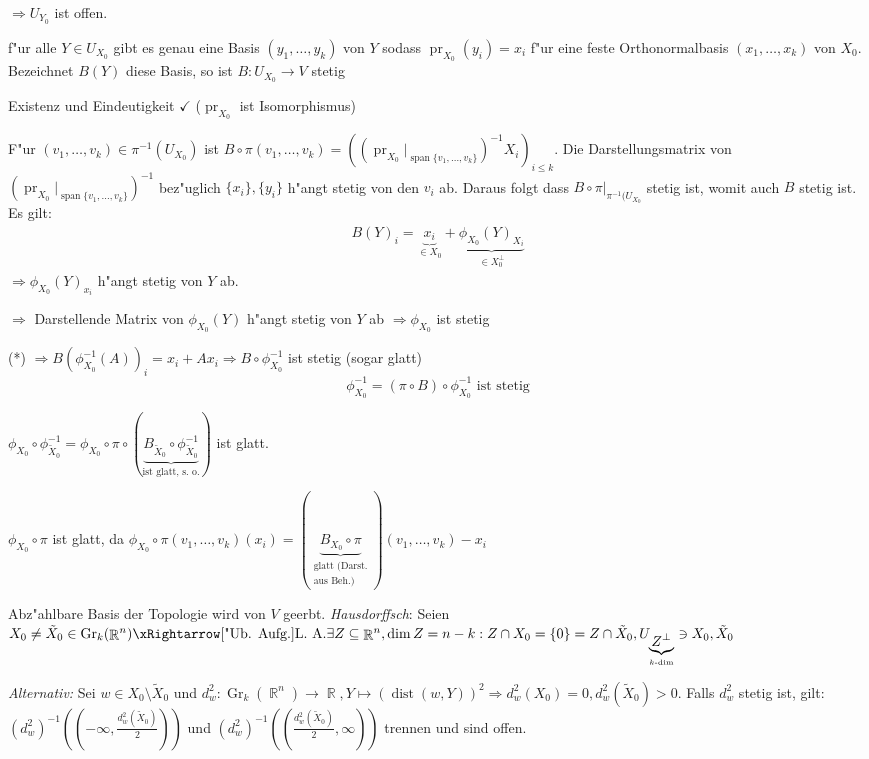 \documentclass[paper=A4, twoside, chapterprefix=true, bibliography=totoc, headsepline]{scrbook}
\let\temp\phi{}
\let\phi\varphi{}
\let\varphi\temp{}
\let\temp\theta{}
\let\theta\vartheta{}
\let\vartheta\temp{}
\let\temp\epsilon{}
\let\epsilon\varepsilon{}
\let\varepsilon\temp{}
\let\temp\rho{}
\let\rho\varrho{}
\let\varrho\temp{}
\DeclareMathOperator{\R}{\mathbb{R}}
\DeclareMathOperator{\dist}{dist}   %
\DeclareMathOperator{\mspan}{span}  %
\DeclareMathOperator{\pr}{pr}
\DeclareMathOperator{\Gr}{Gr}
\theoremstyle{plain}
\theoremstyle{nonumberplain}
\theoremstyle{empty}
\theoremstyle{break}
\begin{document}
$\Rightarrow U_{Y_0}$ ist offen.
\begin{description}[font=\normalfont\bfseries]
\item[zu 2)]\begin{description}[font=\normalfont\itshape]
	\item[Behauptung:] f"ur alle $Y \in U_{X_0}$ gibt es genau eine Basis $(y_1,\ldots ,y_k)$ von $Y$ sodass $\pr_{X_0}(y_i) = x_i$ f"ur eine feste Orthonormalbasis $(x_1,\ldots ,x_k)$ von $X_0$. Bezeichnet $B(Y)$ diese Basis, so ist $B: U_{X_0} \to V$ stetig
	\item[Beweis:] Existenz und Eindeutigkeit $\checkmark$ ($\pr_{X_0}$ ist Isomorphismus)
		
		F"ur $(v_1,\ldots ,v_k) \in \pi^{-1}(U_{X_0})$ ist $B \circ \pi(v_1,\ldots ,v_k) = ((\pr_{X_0}|_{\mspan\{v_1,\ldots ,v_k\}})^{-1} X_i)_{i \le k}$. Die Darstellungsmatrix von $(\pr_{X_0}|_{\mspan\{v_1,\ldots ,v_k\}})^{-1}$ bez"uglich $\{x_i\}, \{y_i\}$ h"angt stetig von den $v_i$ ab. Daraus folgt dass $B \circ \pi|_{\pi^{-1}(U_{X_0}}$ stetig ist, womit auch $B$ stetig ist. Es gilt:
		\begin{align*}
			B(Y)_i = \underbrace{x_i}_{\in X_0} + \underbrace{\varphi_{X_0}(Y)_{X_i}}_{\in X_0^\perp} \tag{*}
		\end{align*}
		$\Rightarrow \varphi_{X_0}(Y)_{x_i}$ h"angt stetig von $Y$ ab.
		
		$\Rightarrow$ Darstellende Matrix von $\varphi_{X_0}(Y)$ h"angt stetig von $Y$ ab $\Rightarrow \varphi_{X_0}$ ist stetig
		
		(*) $\Rightarrow B(\varphi_{X_0}^{-1}(A))_i = x_i + Ax_i \Rightarrow B \circ \varphi_{X_0}^{-1}$ ist stetig (sogar glatt)
			\[ \varphi_{X_0}^{-1} = (\pi \circ B) \circ \varphi_{X_0}^{-1} \text{ ist stetig} \]
	\end{description}
\item[zu 3)]
	$\varphi_{X_0} \circ \varphi_{\tilde X_0}^{-1} = \varphi_{X_0} \circ \pi \circ (\underbrace{B_{\tilde X_0} \circ \varphi_{\tilde X_0}^{-1}}_{\text{ist glatt, s. o.}})$ ist glatt.
	
	$\varphi_{X_0} \circ \pi$ ist glatt, da $\varphi_{X_0} \circ \pi(v_1,\ldots ,v_k)(x_i) = (\underbrace{B_{X_0} \circ \pi}_{\substack{\text{glatt (Darst.}\\ \text{aus Beh.)}}})(v_1,\ldots ,v_k) - x_i$
\item[zu 4)]
	Abz"ahlbare Basis der Topologie wird von $V$ geerbt. \emph{Hausdorffsch}: Seien $X_0 \ne \tilde X_0 \in \Gr_k(\R^n) \xRightarrow[\text{"Ub. Aufg.}]{\text{L. A.}} \exists Z \subseteq \R^n, \dim Z = n-k: Z \cap X_0 = \{0\} = Z \cap \tilde X_0, U_{\underbrace{Z^\perp}_{k\text{-dim}}} \ni X_0, \tilde X_0$
	
	\emph{Alternativ:} Sei $w \in X_0 \setminus \tilde X_0$ und $d_w^2: \Gr_k(\R^n) \to \R, Y \mapsto (\dist(w, Y))^2 \Rightarrow d_w^2(X_0) = 0, d_w^2(\tilde X_0) > 0$. Falls $d_w^2$ stetig ist, gilt: $(d_w^2)^{-1}((-\infty, \frac{d_w^2(\tilde X_0)}{2}))$ und $(d_w^2)^{-1}((\frac{d_w^2(\tilde X_0)}{2}, \infty))$ trennen und sind offen.
\end{description}
\end{document}
